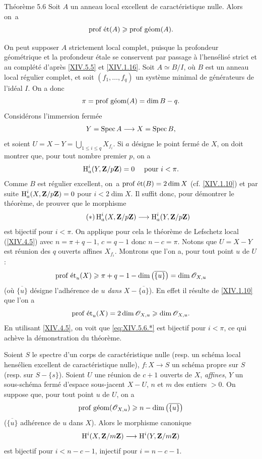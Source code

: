 \label{XIV.5.6}
\begin{enonce*}{Th\'eor\`eme 5.6\ndemark}
Soit $A$ un anneau local excellent de caract\'eristique nulle. Alors on~a
$$
\operatorname{prof\;\acute{e}t}(A)\geqslant\operatorname{prof\;g\acute{e}om}(A).
$$
\end{enonce*}

On peut supposer $A$ strictement local complet, puisque la profondeur g\'eom\'etrique et la profondeur \'etale se conservent par passage \`a l'hens\'elis\'e strict et au compl\'et\'e d'apr\`es \ref{XIV.5.5} et \ref{XIV.1.16}. Soit $A\simeq B/I$, o\`u $B$ est un anneau local r\'egulier complet, et soit $(f_{1},\dots, f_{q})$ un syst\`eme minimal de g\'en\'erateurs de l'id\'eal $I$. On a donc
$$
\pi=\operatorname{prof\;g\acute{e}om}(A)=\dim B-q.
$$
Consid\'erons l'immersion ferm\'ee
$$Y=\Spec A\to X=\Spec B,
$$
et soient $U=X-Y=\bigcup_{1\leq i\leq q}X_{f_{i}}$. Si $a$ d\'esigne le point ferm\'e de $X$, on doit montrer que, pour tout nombre premier $p$, on a
$$
\operatorname{H}_{a}^{i}(Y, \mathbf{Z}/p\mathbf{Z})=0\quad\textrm{ pour }i<\pi.
$$
Comme $B$ est r\'egulier excellent, on~a $\operatorname{prof\;\acute{e}t}(B)=2\dim X$ (cf. \ref{XIV.1.10}) et par suite $\operatorname{H}_{a}^{i}(X, \mathbf{Z}/p\mathbf{Z})=0$ pour $i<2\dim X$. Il suffit donc, pour d\'emontrer le th\'eor\`eme, de prouver que le morphisme
\begin{equation*} \label{eq:XIV.5.6.*} \tag{$*$}
\H_{a}^{i}(X, \ZZ/p\ZZ)\to\H_{a}^{i}(Y, \ZZ/p\ZZ)
\end{equation*}
est bijectif pour $i<\pi$. On applique pour cela le th\'eor\`eme de Lefschetz local (\ref{XIV.4.5}) avec $n=\pi+q-1$, $c=q-1$ donc $n-c=\pi$. Notons que $U=X-Y$ est r\'eunion des $q$ ouverts affines $X_{f_{i}}$. Montrons que l'on a, pour tout point $u$ de $U$:
$$
\operatorname{prof\;\acute{e}t}_{u}(X)\geqslant\pi+q-1-\dim\big(\overline{\{ u\} }\big)=\dim{\mathscr O}_{X, u}$$
(o\`u $\overline{\{ u\} }$ d\'esigne l'adh\'erence de $u$ \emph{dans} $X-\overline{\{ a\} }$). En effet il r\'esulte de \ref{XIV.1.10} que l'on a
$$
\operatorname{prof\;\acute{e}t}_{u}(X)=2\dim{\mathscr O}_{X, u}\geqslant\dim{\mathscr O}_{X, u}.
$$
En utilisant \ref{XIV.4.5}, on voit que \eqref{eq:XIV.5.6.*} est bijectif pour $i<\pi$, ce qui ach\`eve la d\'emonstration du th\'eor\`eme.

\begin{corollaire} \label{XIV.5.7} Soient $S$ le spectre d'un corps de caract\'eristique nulle (resp. un sch\'ema local hens\'elien excellent de caract\'eristique nulle), $f\colon X\to S$ un sch\'ema propre sur $S$ (resp. sur $S-\{ s\}$). Soient $U$ une r\'eunion de $c+1$ ouverts de $X$, \emph{affines}, $Y$ un sous-sch\'ema ferm\'e d'espace sous-jacent $X-U$, $n$ et $m$ des entiers $>0$. On suppose que, pour tout point $u$ de $U$, on a
$$
\operatorname{prof\;g\acute{e}om}({\mathscr O}_{X, u})\geqslant n-\dim\big(\overline{\{ u\} }\big)$$
($\overline{\{ u\} }$ adh\'erence de $u$ dans $X$). Alors le morphisme canonique
$$
\H^{i}(X, \ZZ/m\ZZ)\to\H^{i}(Y, \ZZ/m\ZZ)$$
est bijectif pour $i<n-c-1$, injectif pour $i=n-c-1$.
\end{corollaire}

